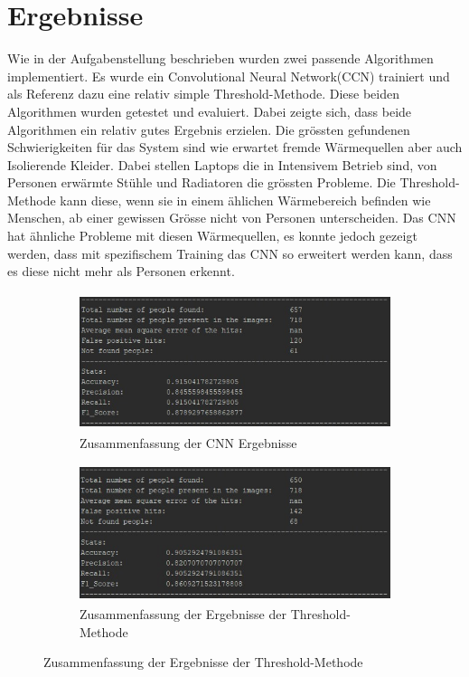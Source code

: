 \documentclass[
	a4paper
]{scrartcl}
\begin{document}
\section{Ergebnisse}
Wie in der Aufgabenstellung beschrieben wurden zwei passende Algorithmen implementiert. Es wurde ein Convolutional Neural Network(CCN) trainiert und als Referenz dazu eine relativ simple Threshold-Methode. Diese beiden Algorithmen wurden getestet und evaluiert. Dabei zeigte sich, dass beide Algorithmen ein relativ gutes Ergebnis erzielen. Die grössten gefundenen Schwierigkeiten für das System sind wie erwartet fremde Wärmequellen aber auch Isolierende Kleider. Dabei stellen Laptops die in Intensivem Betrieb sind, von Personen erwärmte Stühle und Radiatoren die grössten Probleme. Die Threshold-Methode kann diese, wenn sie in einem ählichen Wärmebereich befinden wie Menschen, ab einer gewissen Grösse nicht von Personen unterscheiden. Das CNN hat ähnliche Probleme mit diesen Wärmequellen, es konnte jedoch gezeigt werden, dass mit spezifischem Training das CNN so erweitert werden kann, dass es diese nicht mehr als Personen erkennt. 

\begin{figure}[H]
	\begin{subfigure}{\linewidth}
		\centering
		\includegraphics[keepaspectratio, height=4cm]{cnnSummary}
		\caption{Zusammenfassung der CNN Ergebnisse}
		\label{fig:cnnSummary}		
	\end{subfigure}
	\begin{subfigure}{\linewidth}
		\centering
		\includegraphics[keepaspectratio, height=4cm]{threshSummary}
		\caption{Zusammenfassung der Ergebnisse der Threshold-Methode}
		\label{fig:threshSummary}		
	\end{subfigure}
\end{figure}
\end{document}

